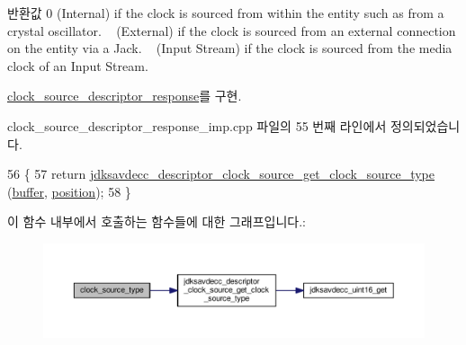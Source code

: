 \begin{DoxyReturn}{반환값}
0 (Internal) if the clock is sourced from within the entity such as from a crystal oscillator. ~ (External) if the clock is sourced from an external connection on the entity via a Jack. ~ (Input Stream) if the clock is sourced from the media clock of an Input Stream. 
\end{DoxyReturn}


\hyperlink{classavdecc__lib_1_1clock__source__descriptor__response_a284b9325d868e1cdc4aca47aa760bc67}{clock\+\_\+source\+\_\+descriptor\+\_\+response}를 구현.



clock\+\_\+source\+\_\+descriptor\+\_\+response\+\_\+imp.\+cpp 파일의 55 번째 라인에서 정의되었습니다.


\begin{DoxyCode}
56 \{
57     \textcolor{keywordflow}{return} \hyperlink{group__descriptor__clock__source_ga1d91d1447296699aa5ed39d00026e44e}{jdksavdecc\_descriptor\_clock\_source\_get\_clock\_source\_type}
      (\hyperlink{classavdecc__lib_1_1descriptor__response__base__imp_a56ed84df35de10bdb65e72b184309497}{buffer}, \hyperlink{classavdecc__lib_1_1descriptor__response__base__imp_a7a04afe5347934be732ec70a70bd0a28}{position});
58 \}
\end{DoxyCode}


이 함수 내부에서 호출하는 함수들에 대한 그래프입니다.\+:
\nopagebreak
\begin{figure}[H]
\begin{center}
\leavevmode
\includegraphics[width=350pt]{classavdecc__lib_1_1clock__source__descriptor__response__imp_a19f32d82cb876f44969b84e488c51365_cgraph}
\end{center}
\end{figure}


